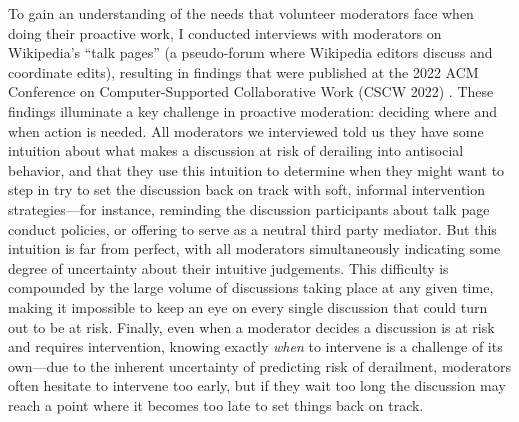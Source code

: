 \documentclass[11pt,letterpaper]{article}
\begin{document}

To gain an understanding of the needs that volunteer moderators face when doing their proactive work, I conducted interviews with moderators on Wikipedia's ``talk pages'' (a pseudo-forum where Wikipedia editors discuss and coordinate edits), resulting in findings that were published at the 2022 ACM Conference on Computer-Supported Collaborative Work (CSCW 2022) \cite{schluger_proactive_2022}.
These findings illuminate a key challenge in proactive moderation: deciding where and when action is needed.
All moderators we interviewed told us they have some intuition about what makes a discussion at risk of derailing into antisocial behavior, and that they use this intuition to determine when they might want to step in try to set the discussion back on track with soft, informal intervention strategies---for instance, reminding the discussion participants about talk page conduct policies, or offering to serve as a neutral third party mediator.
But this intuition is far from perfect, with all moderators simultaneously indicating some degree of uncertainty about their intuitive judgements.
This difficulty is compounded by the large volume of discussions taking place at any given time, making it impossible to keep an eye on every single discussion that could turn out to be at risk.
Finally, even when a moderator decides a discussion is at risk and requires intervention, knowing exactly \emph{when} to intervene is a challenge of its own---due to the inherent uncertainty of predicting risk of derailment, moderators often hesitate to intervene too early, but if they wait too long the discussion may reach a point where it becomes too late to set things back on track.%
\end{document}
